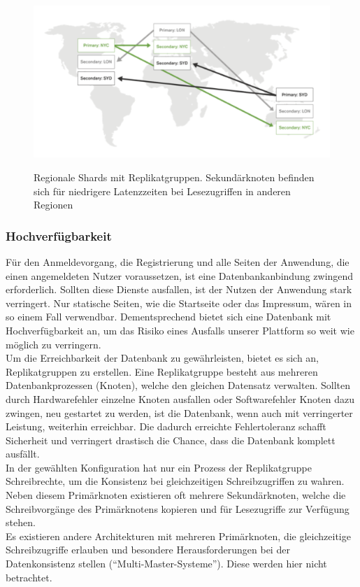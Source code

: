 \begin{figure}
	\centering
    \includegraphics[width=\textwidth]{sources/MongoDB_sharded.png}\cite{db:mongoActiveActiveImage}
	\caption{Regionale Shards mit Replikatgruppen. Sekundärknoten befinden sich für niedrigere Latenzzeiten bei Lesezugriffen in anderen Regionen}
	\label{fig:db:mongoActiveActive}
\end{figure}

\subsubsection{Hochverfügbarkeit}
Für den Anmeldevorgang, die Registrierung und alle Seiten der Anwendung, die einen angemeldeten Nutzer voraussetzen, ist eine Datenbankanbindung zwingend erforderlich.
Sollten diese Dienste ausfallen, ist der Nutzen der Anwendung stark verringert.
Nur statische Seiten, wie die Startseite oder das Impressum, wären in so einem Fall verwendbar.
Dementsprechend bietet sich eine Datenbank mit Hochverfügbarkeit an, um das Risiko eines Ausfalls unserer Plattform so weit wie möglich zu verringern.\\
Um die Erreichbarkeit der Datenbank zu gewährleisten, bietet es sich an, Replikatgruppen zu erstellen.
Eine Replikatgruppe besteht aus mehreren Datenbankprozessen (Knoten), welche den gleichen Datensatz verwalten. \cite{db:mongoReplicaSetMembers}
Sollten durch Hardwarefehler einzelne Knoten ausfallen oder Softwarefehler Knoten dazu zwingen, neu gestartet zu werden, ist die Datenbank, wenn auch mit verringerter Leistung, weiterhin erreichbar.
Die dadurch erreichte Fehlertoleranz schafft Sicherheit und verringert drastisch die Chance, dass die Datenbank komplett ausfällt.\\
In der gewählten Konfiguration hat nur ein Prozess der Replikatgruppe Schreibrechte, um die Konsistenz bei gleichzeitigen Schreibzugriffen zu wahren.
Neben diesem Primärknoten existieren oft mehrere Sekundärknoten, welche die Schreibvorgänge des Primärknotens kopieren und für Lesezugriffe zur Verfügung stehen.\\
Es existieren andere Architekturen mit mehreren Primärknoten, die gleichzeitige Schreibzugriffe erlauben und besondere Herausforderungen bei der Datenkonsistenz stellen (\enquote{Multi-Master-Systeme}).
Diese werden hier nicht betrachtet.

